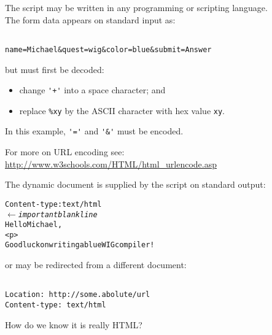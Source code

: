 \begin{slide*}
The script may be written in any programming or scripting language.\\

The form data appears on standard input as:

\begin{scriptsize}
\begin{verbatim}
 
name=Michael&quest=wig&color=blue&submit=Answer

\end{verbatim}
\end{scriptsize}

but must first be decoded:
\begin{itemize}
\item change \verb:'+': into a space character; and
\item replace \verb:%xy: by the ASCII character with hex value \verb"xy".
\end{itemize}

In this example, \verb"'='" and \verb"'&'" must be encoded.

For more on URL encoding see:\\
{\scriptsize\url{http://www.w3schools.com/HTML/html_urlencode.asp}} 
\vfil
\end{slide*}
 

\begin{slide*}
\newcommand{\important}{\hspace*{15em}$\longleftarrow${\rm\em important blank line}}
The dynamic document is supplied by the script on standard output:

\begin{scriptsize}
\begin{alltt}
 
Content-type: text/html
\important{}
Hello Michael,
<p>
Good luck on writing a blue WIG compiler!

\end{alltt}
\end{scriptsize}

or may be redirected from a different document:

\begin{scriptsize}
\begin{verbatim}

Location: http://some.abolute/url
Content-type: text/html

\end{verbatim}
\end{scriptsize}

How do we know it is really HTML?

\vfil
\end{slide*}
 
